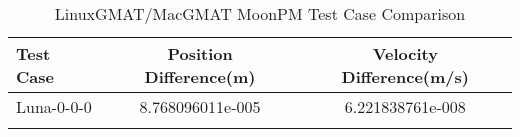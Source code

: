 \begin{table}[htbp!]
\centering
\caption{ LinuxGMAT/MacGMAT MoonPM Test Case Comparison}
      \begin{tabular}{lcc}
      \hline\hline
          Test Case & Position Difference(m) & Velocity Difference(m/s) \\
         \hline
         Luna-0-0-0 & 8.768096011e-005 & 6.221838761e-008 \\
      \hline\hline
      \label{Table: MoonPM LinuxGMAT-MacGMAT Table} 
\end{tabular}
\end{table}
